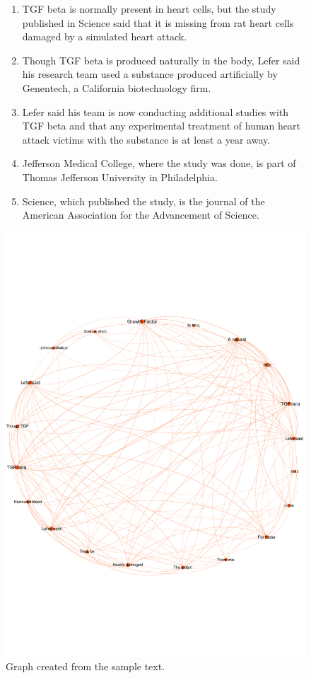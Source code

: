 \documentclass{llncs}
\begin{document}
\begin{figure}
{{{\begin{enumerate}
\item TGF beta is normally present in heart cells, but the study published in Science said that it is missing from rat heart cells damaged by a simulated heart attack.
\item Though TGF beta is produced naturally in the body, Lefer said his research team used a substance produced artificially by Genentech, a California biotechnology firm.
\item Lefer said his team is now conducting additional studies with TGF beta and that any experimental treatment of human heart attack victims with the substance is at least a year away.
\item Jefferson Medical College, where the study was done, is part of Thomas Jefferson University in Philadelphia.
\item Science, which published the study, is the journal of the American Association for the Advancement of Science. 
\end{enumerate}
}}}
\end{figure}

\begin{figure}[h!]
    \centering
    \includegraphics[trim = 0mm 50mm 0mm 50mm, clip, scale=0.15,width=1\textwidth]{graph.pdf}
    \caption{Graph created from the sample text.}
    \label{fig:graph}
\end{figure}
\end{document}
